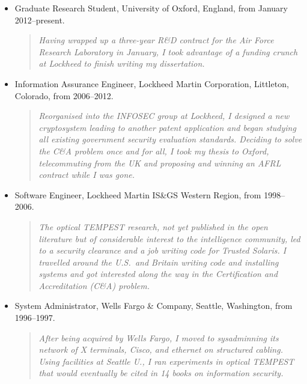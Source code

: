 \documentclass[letterpaper]{article}
\begin{document}
\begin{itemize}
	\item Graduate Research Student, University of Oxford, England, from January 2012--present.

		\begin{quote}\vspace{-2mm}
			\emph{Having wrapped up a three-year R\&D contract for the Air Force Research
			Laboratory in January, I took advantage of a funding crunch at Lockheed to finish
			writing my dissertation.}
		\end{quote}

	\item Information Assurance Engineer, Lockheed Martin Corporation, Littleton, Colorado, from
		2006--2012.

		\begin{quote}\vspace{-2mm}
			\emph{Reorganised into the INFOSEC group at Lockheed, I designed a new
			cryptosystem leading to another patent application and began studying all existing
			government security evaluation standards.  Deciding to solve the C\&A problem once
			and for all, I took my thesis to Oxford, telecommuting from the UK and proposing
			and winning an AFRL contract while I was gone.}
		\end{quote}

	\item Software Engineer, Lockheed Martin IS\&GS Western Region, from 1998--2006.

		\begin{quote}\vspace{-2mm}
			\emph{The optical TEMPEST research, not yet published in the open literature but of
			considerable interest to the intelligence community, led to a security clearance and
			a job writing code for Trusted Solaris.  I travelled around the U.S.\ and Britain
			writing code and installing systems and got interested along the way in the
			Certification and Accreditation (C\&A) problem.}
		\end{quote}

	\item System Administrator, Wells Fargo \& Company, Seattle, Washington, from  1996--1997.

		\begin{quote}\vspace{-2mm}
			\emph{After being acquired by Wells Fargo, I moved to sysadminning its network
			of X terminals, Cisco, and ethernet on structured cabling.  Using facilities
			at Seattle U., I ran experiments in optical TEMPEST that would eventually
			be cited in 14 books on information security.}
		\end{quote}


\end{itemize}
\end{document}
